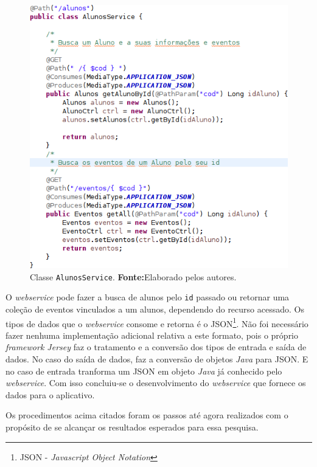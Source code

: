 		\begin{figure}[h!]
			\centerline{\includegraphics[scale=0.7]{./imagens/2_q_metodologico/qm11.png}}
			\caption[Classe \texttt{AlunosService}]{Classe \texttt{AlunosService}.
			\textbf{Fonte:}Elaborado pelos autores.}
			\label{fig:qm11}
		\end{figure}
		
		\par O \textit{webservice} pode fazer a busca de alunos pelo \texttt{id}
passado ou retornar uma coleção de eventos vinculados a um alunos, dependendo
do recurso acessado. Os tipos de dados que o \textit{webservice} consome e
retorna é o JSON\footnote{JSON - \textit{Javascript Object Notation}}. Não foi
necessário fazer nenhuma implementação adicional relativa a este formato, pois
o próprio \textit{framework Jersey} faz o tratamento e a conversão dos tipos de
entrada e saída de dados. No caso do saída de dados, faz a conversão de objetos 
\textit{Java} para JSON. E no caso de entrada tranforma um JSON em objeto
\textit{Java} já conhecido pelo \textit{webservice}. Com isso concluiu-se o
desenvolvimento do \textit{webservice} que fornece os dados para o aplicativo.

	\par Os procedimentos acima citados foram os passos até agora realizados com o
propósito de se alcançar os resultados esperados para essa pesquisa.
		